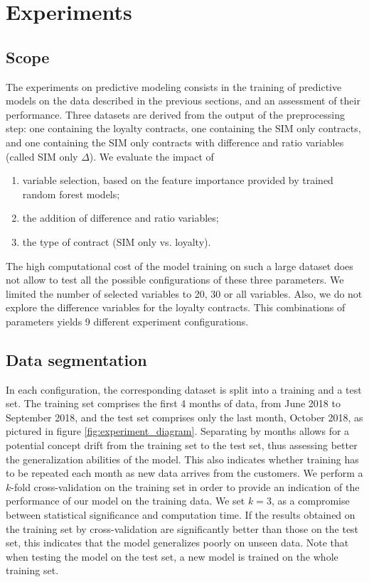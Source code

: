 \section{Experiments}
\label{sec:churn_exp}

\subsection{Scope}

The experiments on predictive modeling consists in the training of predictive
models on the data described in the previous sections, and an assessment of
their performance. Three datasets are derived from the output of the
preprocessing step: one containing the loyalty contracts, one containing the SIM
only contracts, and one containing the SIM only contracts with difference and
ratio variables (called SIM only $\Delta$). We evaluate the impact of

\begin{enumerate}
    \item variable selection, based on the feature importance provided by
    trained random forest models;
    \item the addition of difference and ratio variables;
    \item the type of contract (SIM only vs. loyalty).
\end{enumerate}

The high computational cost of the model training on such a large dataset does
not allow to test all the possible configurations of these three parameters. We
limited the number of selected variables to 20, 30 or all variables. Also, we do
not explore the difference variables for the loyalty contracts. This
combinations of parameters yields 9 different experiment configurations.


\subsection{Data segmentation}
\label{sec:churn_data_seg}

In each configuration, the corresponding dataset is split into a training and a
test set. The training set comprises the first 4 months of data, from June 2018
to September 2018, and the test set comprises only the last month, October 2018,
as pictured in figure \ref{fig:experiment_diagram}. Separating by months allows
for a potential concept drift from the training set to the test set, thus
assessing better the generalization abilities of the model. This also indicates
whether training has to be repeated each month as new data arrives from the
customers. We perform a $k$-fold cross-validation on the training set in order
to provide an indication of the performance of our model on the training data.
We set $k=3$, as a compromise between statistical significance and computation
time. If the results obtained on the training set by cross-validation are
significantly better than those on the test set, this indicates that the model
generalizes poorly on unseen data. Note that when testing the model on the test
set, a new model is trained on the whole training set.


